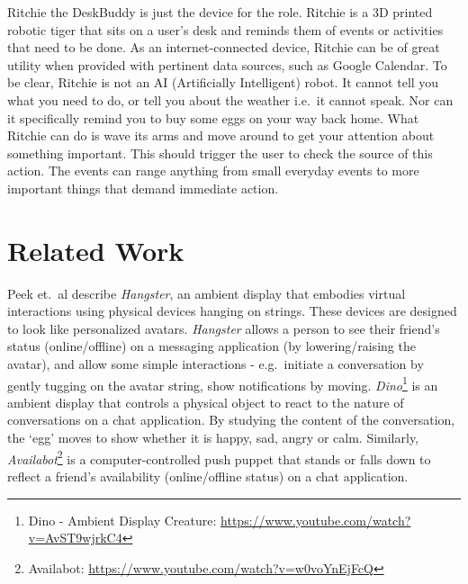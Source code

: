\documentclass{sigchi-ext}
\begin{document}
Ritchie the DeskBuddy is just the device for the role. Ritchie is a 3D printed
robotic tiger that sits on a user's desk and reminds them of events or
activities that need to be done. As an internet-connected device, Ritchie can
be of great utility when provided with pertinent data sources, such as Google
Calendar. To be clear, Ritchie is not an AI (Artificially Intelligent) robot.
It cannot tell you what you need to do, or tell you about the weather i.e.\ it
cannot speak. Nor can it specifically remind you to buy some eggs on your way
back home. What Ritchie can do is wave its arms and move around to get your
attention about something important. This should trigger the user to check the
source of this action. The events can range anything from small everyday events
to more important things that demand immediate action.

\section{Related Work}

Peek et.\ al \cite{peek2009hangsters} describe \textit{Hangster}, an ambient
display that embodies virtual interactions using physical devices hanging on
strings. These devices are designed to look like personalized avatars.
\textit{Hangster} allows a person to see their friend's status (online/offline)
on a messaging application (by lowering/raising the avatar), and allow some
simple interactions - e.g.\ initiate a conversation by gently tugging on the
avatar string, show notifications by moving. \textit{Dino}\footnote{Dino -
  Ambient Display Creature: \url{https://www.youtube.com/watch?v=AvST9wjrkC4}} is an
ambient display that controls a physical object to react to the nature of
conversations on a chat application. By studying the content of the
conversation, the `egg' moves to show whether it is happy, sad, angry or calm.
Similarly, \textit{Availabot}\footnote{Availabot:
\url{https://www.youtube.com/watch?v=w0voYnEjFcQ}} is a computer-controlled push
puppet that stands or falls down to reflect a friend's availability
(online/offline status) on a chat application.
\end{document}
